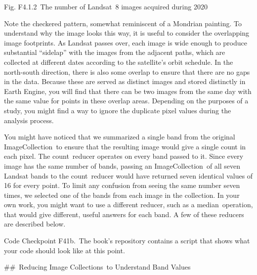 \documentclass[
  letterpaper,
  DIV=11,
  numbers=noendperiod]{scrreprt}
\begin{document}
Fig. F4.1.2~The number of Landsat~8 images acquired during 2020

Note the checkered pattern, somewhat reminiscent of a Mondrian painting.
To understand why the image looks this way, it is useful to consider the
overlapping image footprints. As Landsat passes over, each image is wide
enough to produce substantial ``sidelap'' with the images from the
adjacent paths, which are collected at different dates according to the
satellite's orbit schedule. In the north-south direction, there is also
some overlap to ensure that there are no gaps in the data. Because these
are served as distinct images and stored distinctly in Earth Engine, you
will find that there can be two images from the same day with the same
value for points in these overlap areas. Depending on the purposes of a
study, you might find a way to ignore the duplicate pixel values during
the analysis process.

You might have noticed that we summarized a single band from the
original ImageCollection~to ensure that the resulting image would give a
single count in each pixel. The count~reducer operates on every band
passed to it. Since every image has the same number of bands, passing an
ImageCollection~of all seven Landsat bands to the count~reducer would
have returned seven identical values of 16 for every point. To limit any
confusion from seeing the same number seven times, we selected one of
the bands from each image in the collection. In your own work, you might
want to use a different reducer, such as a median~operation, that would
give different, useful answers for each band. A few of these reducers
are described below.

\begin{tcolorbox}[enhanced jigsaw, left=2mm, breakable, rightrule=.15mm, opacityback=0, colframe=quarto-callout-note-color-frame, colbacktitle=quarto-callout-note-color!10!white, arc=.35mm, opacitybacktitle=0.6, toptitle=1mm, colback=white, leftrule=.75mm, title=\textcolor{quarto-callout-note-color}{\faInfo}\hspace{0.5em}{Note}, toprule=.15mm, bottomtitle=1mm, titlerule=0mm, bottomrule=.15mm, coltitle=black]

Code Checkpoint F41b.~The book's repository contains a script that shows
what your code should look like at this point.

\end{tcolorbox}

\#\#~Reducing Image Collections~to Understand Band Values
\end{document}
